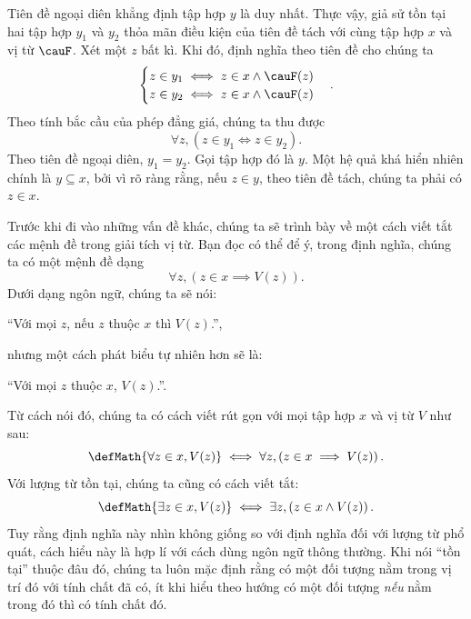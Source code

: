 Tiên đề ngoại diên khẳng định tập hợp $y$ là duy nhất. Thực vậy, giả sử tồn tại hai tập hợp $y_1$ và $y_2$ thỏa mãn điều kiện của tiên đề tách với cùng tập hợp $x$ và vị từ $\cauF$. Xét một $z$ bất kì. Khi đó, định nghĩa theo tiên đề cho chúng ta
\begin{equation*}
    \begin{cases}
        z \in y_1 \iff z \in x \land \cauF(z) \\
        z \in y_2 \iff z \in x \land \cauF(z)
    \end{cases}.
\end{equation*}
Theo tính bắc cầu của phép đẳng giá, chúng ta thu được
\begin{equation*}
    \forall z, \left( z \in y_1 \iff z \in y_2 \right).
\end{equation*}
Theo tiên đề ngoại diên, $y_1 = y_2$. Gọi tập hợp đó là $y$. Một hệ quả khá hiển nhiên chính là $y \subseteq x$, bởi vì rõ ràng rằng, nếu $z \in y$, theo tiên đề tách, chúng ta phải có $z \in x$.

Trước khi đi vào những vấn đề khác, chúng ta sẽ trình bày về một cách viết tắt các mệnh đề trong giải tích vị từ. Bạn đọc có thể để ý, trong định nghĩa, chúng ta có một mệnh đề dạng
$$
   \forall z, \left(z \in x \implies V(z)\right).
$$
Dưới dạng ngôn ngữ, chúng ta sẽ nói:
\begin{center}
   ``Với mọi $z$, nếu $z$ thuộc $x$ thì $V(z)$.'',
\end{center}
nhưng một cách phát biểu tự nhiên hơn sẽ là:
\begin{center}
   ``Với mọi $z$ thuộc $x$, $V(z)$.''.
\end{center}
Từ cách nói đó, chúng ta có cách viết rút gọn với mọi tập hợp $x$ và vị từ $V$ như sau:
\begin{equation*}
   \defMath{\forall z \in x, V(z)} \iff \forall z, \left(z \in x \implies V(z)\right).
\end{equation*}
Với lượng từ tồn tại, chúng ta cũng có cách viết tắt:
\begin{equation*}
   \defMath{\exists z \in x, V(z)} \iff \exists z, \left(z \in x \land V(z)\right).
\end{equation*}
Tuy rằng định nghĩa này nhìn không giống so với định nghĩa đối với lượng từ phổ quát, cách hiểu này là hợp lí với cách dùng ngôn ngữ thông thường. Khi nói ``tồn tại'' thuộc đâu đó, chúng ta luôn mặc định rằng có một đối tượng nằm trong vị trí đó với tính chất đã có, ít khi hiểu theo hướng có một đối tượng \emph{nếu} nằm trong đó thì có tính chất đó.

